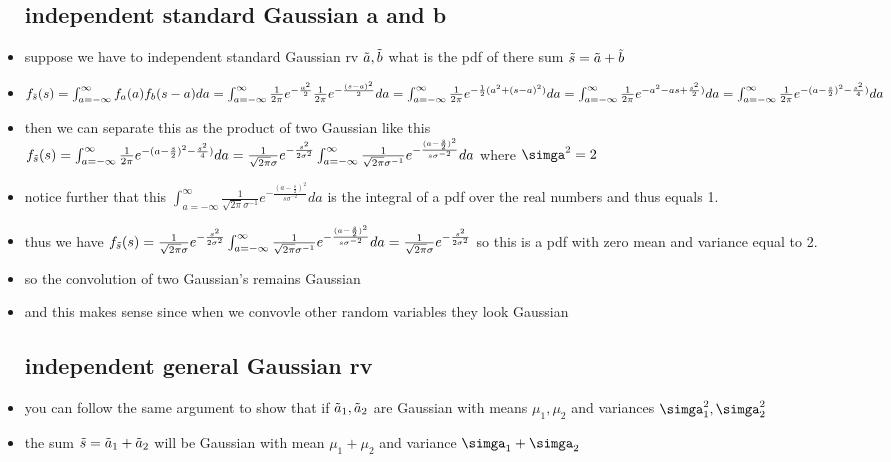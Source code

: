 \documentclass{article}
\begin{document}
\begin{itemize}
\subsection{independent standard Gaussian a and b}
\item suppose we have to independent standard Gaussian rv $\Tilde{a}, \Tilde{b}$
what is the pdf of there sum $\Tilde{s}=\Tilde{a}+\Tilde{b}$
\item $f_{\Tilde{s}}(s)=\int_{a=-\infty}^{\infty}f_{a}(a)f_{b}(s-a)da=\int_{a=-\infty}^{\infty}\frac{1}{2\pi}e^{-\frac{a^2}{2}}\frac{1}{2\pi}e^{-\frac{(s-a)^2}{2}}da=\int_{a=-\infty}^{\infty}\frac{1}{2\pi}e^{-\frac{1}{2} (a^2+(s-a)^2)}da=\int_{a=-\infty}^{\infty}\frac{1}{2\pi}e^{-a^2-as+\frac{s^2}{2})}da=\int_{a=-\infty}^{\infty}\frac{1}{2\pi}e^{-(a-\frac{s}{2})^2-\frac{s^2}{4})}da$
\item then we can separate this as the product of two Gaussian like this $f_{\Tilde{s}}(s)=\int_{a=-\infty}^{\infty}\frac{1}{2\pi}e^{-(a-\frac{s}{2})^2-\frac{s^2}{4})}da=\frac{1}{\sqrt{2\pi}\sigma}e^{-\frac{s^2}{2\sigma^2}}\int_{a=-\infty}^{\infty}\frac{1}{\sqrt{2\pi}\sigma^{-1}}e^{-\frac{(a-\frac{s}{2})^2}{s\sigma^{-2}}}da$ where $\simga^{2}=2$
\item notice further that this $\int_{a=-\infty}^{\infty}\frac{1}{\sqrt{2\pi}\sigma^{-1}}e^{-\frac{(a-\frac{s}{2})^2}{s\sigma^{-2}}}da$ is the integral of a pdf over the real numbers and thus equals 1. 
\item thus we have $f_{\Tilde{s}}(s)=\frac{1}{\sqrt{2\pi}\sigma}e^{-\frac{s^2}{2\sigma^2}}\int_{a=-\infty}^{\infty}\frac{1}{\sqrt{2\pi}\sigma^{-1}}e^{-\frac{(a-\frac{s}{2})^2}{s\sigma^{-2}}}da=\frac{1}{\sqrt{2\pi}\sigma}e^{-\frac{s^2}{2\sigma^2}}$ so this is a pdf with zero mean and variance equal to 2. 
\item so the convolution of two Gaussian's remains Gaussian 
\item and this makes sense since when we convovle other random variables they look Gaussian 
\subsection{independent general Gaussian rv}
\item you can follow the same argument to show that if $\Tilde{a}_1,\Tilde{a}_2$ are Gaussian with means $\mu_1,\mu_2$ and variances $\simga_{1}^{2},\simga_{2}^{2}$
\item the sum $\Tilde{s}=\Tilde{a}_1+\Tilde{a}_2$ will be Gaussian with mean $\mu_1+\mu_2$ and variance $\simga_1+\simga_2$ 
\end{itemize}
\end{document}
